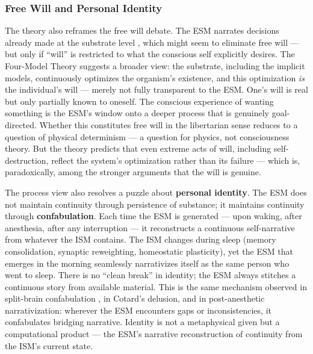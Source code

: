 \documentclass[12pt]{article}
\begin{document}
\subsubsection{Free Will and Personal Identity}


The theory also reframes the free will debate. The ESM narrates decisions already made at the substrate level \citep{Libet1985,Schurger2012,Wegner2002}, which might seem to eliminate free will --- but only if ``will'' is restricted to what the conscious self explicitly desires. The Four-Model Theory suggests a broader view: the substrate, including the implicit models, continuously optimizes the organism's existence, and this optimization \emph{is} the individual's will --- merely not fully transparent to the ESM. One's will is real but only partially known to oneself. The conscious experience of wanting something is the ESM's window onto a deeper process that is genuinely goal-directed. Whether this constitutes free will in the libertarian sense reduces to a question of physical determinism --- a question for physics, not consciousness theory. But the theory predicts that even extreme acts of will, including self-destruction, reflect the system's optimization rather than its failure --- which is, paradoxically, among the stronger arguments that the will is genuine.

The process view also resolves a puzzle about \textbf{personal identity}. The ESM does not maintain continuity through persistence of substance; it maintains continuity through \textbf{confabulation}. Each time the ESM is generated --- upon waking, after anesthesia, after any interruption --- it reconstructs a continuous self-narrative from whatever the ISM contains. The ISM changes during sleep (memory consolidation, synaptic reweighting, homeostatic plasticity), yet the ESM that emerges in the morning seamlessly narrativizes itself as the same person who went to sleep. There is no ``clean break'' in identity; the ESM always stitches a continuous story from available material. This is the same mechanism observed in split-brain confabulation \citep{Gazzaniga2000}, in Cotard's delusion, and in post-anesthetic narrativization: wherever the ESM encounters gaps or inconsistencies, it confabulates bridging narrative. Identity is not a metaphysical given but a computational product --- the ESM's narrative reconstruction of continuity from the ISM's current state.
\end{document}
